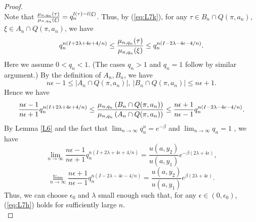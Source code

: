 \begin{proof}
\[\]
Note that $\frac{\mu_{n, q_n}(\tau)}{\mu_{n, q_n}(\xi)} = q_n^{l(\tau) - l(\xi)}$. Thus, by (\ref{eq:L7k}), for any $\tau \in B_n \cap Q(\pi, a_n)$, $\xi \in A_n \cap Q(\pi, a_n)$, we have
\[
q_n^{n(I + 2 \lambda + 4 \epsilon + 4/n)} \le \frac{\mu_{n, q_n}(\tau)}{\mu_{n, q_n}(\xi)} \le q_n^{n(I - 2 \lambda - 4 \epsilon - 4/n)}.
\]
Here we assume $0 < q_n < 1$. (The cases $q_n > 1$ and $q_n = 1$ follow by similar argument.) By the definition of $A_n, B_n$, we have 
\[
n\epsilon - 1 \le |A_n \cap Q(\pi, a_n)|,\ |B_n \cap Q(\pi, a_n)| \le n\epsilon + 1.
\]
Hence we have
\[
\frac{n\epsilon -1}{n\epsilon + 1} q_n^{n(I + 2 \lambda + 4 \epsilon + 4/n)}
\le \frac{\mu_{n, q_n} \left(B_n \cap Q(\pi, a_n) \right)}{\mu_{n, q_n} \left(A_n \cap Q(\pi, a_n) \right)}
\le \frac{n\epsilon + 1}{n\epsilon - 1} q_n^{n(I - 2 \lambda - 4 \epsilon - 4/n)}.
\]
By Lemma \ref{L6} and the fact that $\lim_{n \to \infty} q_n^n = e^{-\beta}$ and $\lim_{n \to \infty} q_n = 1$ , we have
\[
\lim_{n \to \infty} \frac{n\epsilon -1}{n\epsilon + 1} q_n^{n(I + 2 \lambda + 4 \epsilon + 4/n)} =
\frac{u(a, y_2)}{u(a, y_1)} e^{-\beta (2 \lambda + 4 \epsilon)},
\]
\[
\lim_{n \to \infty} \frac{n\epsilon + 1}{n\epsilon - 1} q_n^{n(I - 2 \lambda - 4 \epsilon - 4/n)} =
\frac{u(a, y_2)}{u(a, y_1)} e^{\beta (2 \lambda + 4 \epsilon)}.
\]
Thus, we can choose $\epsilon_0$ and $\lambda$ small enough such that, for any $\epsilon \in (0, \epsilon_0)$, (\ref{eq:L7h}) holds for sufficiently large $n$.\\


\end{proof}
